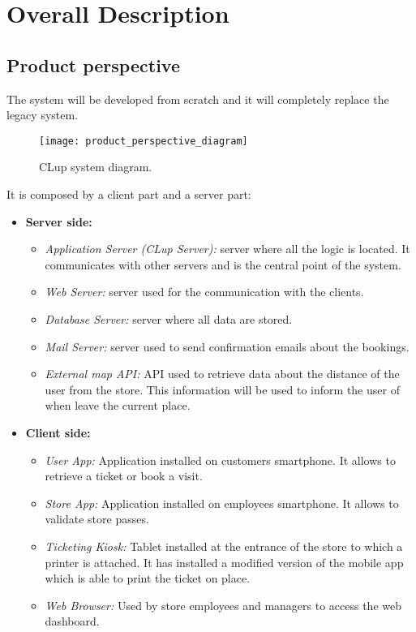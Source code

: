 \chapter{Overall Description}

\section{Product perspective}
The system will be developed from scratch and it will completely replace the legacy system. \newline

\vspace{0.8em}
\begin{figure}[H]
	\centering
	\texttt{[image: product\_perspective\_diagram]}
	\caption{CLup system diagram.}
\end{figure}


It is composed by a client part and a server part:
\begin{itemize}
	\item \textbf{Server side:}
	\begin{itemize}
		\item \textit{Application Server (CLup Server):} server where all the logic is located. It communicates with other servers and is the central point of the system.
		\item \textit{Web Server:} server used for the communication with the clients.
		\item \textit{Database Server:} server where all data are stored.
		\item \textit{Mail Server:} server used to send confirmation emails about the bookings.
		\item \textit{External map API:} API used to retrieve data about the distance of the user from the store. This information will be used to inform the user of when leave the current place.
	\end{itemize}
	\item \textbf{Client side:}
	\begin{itemize}
		\item \textit{User App:} Application installed on customers smartphone. It allows to retrieve a ticket or book a visit.
		\item \textit{Store App:} Application installed on employees smartphone. It allows to validate store passes.
		\item \textit{Ticketing Kiosk:} Tablet installed at the entrance of the store to which a printer is attached. It has installed a modified version of the mobile app which is able to print the ticket on place.
		\item \textit{Web Browser:} Used by store employees and managers to access the web dashboard.
	\end{itemize}
\end{itemize}

